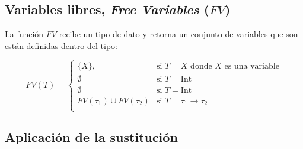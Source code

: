 \documentclass{article}
\theoremstyle{definition}
\begin{document}
\subsection{Variables libres, \emph{Free Variables} ($FV$) }
\label{sec:fv}

La función $FV$ recibe un tipo de dato y retorna un conjunto de
variables que son están definidas dentro del tipo:

\[
  FV(T) =
  \begin{cases}
    \{X\}, & \text{si $T = X$ donde $X$ es una variable} \\
    \emptyset & \text{si $T = \text{Int}$} \\
    \emptyset & \text{si $T = \text{Int}$} \\
    FV(\tau_1) \cup FV(\tau_2) & \text{si $T = \tau_1 \to \tau_2$} \\
  \end{cases}
\]

\subsection{Aplicación de la sustitución}
\label{sec:aplsus}
\end{document}
